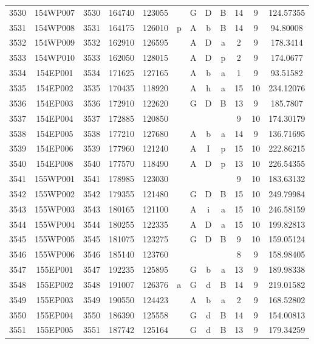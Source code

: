 \begin{tabular}{|*{12}{c|}}
3530 & 154WP007 & 3530 & 164740 & 123055 &  & G & D & B & 14 & 9 & 124.57355 \\ 
3531 & 154WP008 & 3531 & 164175 & 126010 & p & A & b & B & 14 & 9 & 94.80008 \\ 
3532 & 154WP009 & 3532 & 162910 & 126595 &  & A & D & a & 2 & 9 & 178.3414 \\ 
3533 & 154WP010 & 3533 & 162050 & 128015 &  & A & D & p & 2 & 9 & 174.0677 \\ 
3534 & 154EP001 & 3534 & 171625 & 127165 &  & A & b & a & 1 & 9 & 93.51582 \\ 
3535 & 154EP002 & 3535 & 170435 & 118920 &  & A & h & a & 15 & 10 & 234.12076 \\ 
3536 & 154EP003 & 3536 & 172910 & 122620 &  & G & D & B & 13 & 9 & 185.7807 \\ 
3537 & 154EP004 & 3537 & 172885 & 120850 &  &  &  &  & 9 & 10 & 174.30179 \\ 
3538 & 154EP005 & 3538 & 177210 & 127680 &  & A & b & a & 14 & 9 & 136.71695 \\ 
3539 & 154EP006 & 3539 & 177960 & 121240 &  & A & I & p & 15 & 10 & 222.86215 \\ 
3540 & 154EP008 & 3540 & 177570 & 118490 &  & A & D & p & 13 & 10 & 226.54355 \\ 
3541 & 155WP001 & 3541 & 178985 & 123030 &  &  &  &  & 9 & 10 & 183.63132 \\ 
3542 & 155WP002 & 3542 & 179355 & 121480 &  & G & D & B & 15 & 10 & 249.79984 \\ 
3543 & 155WP003 & 3543 & 180165 & 121100 &  & A & i & a & 15 & 10 & 246.58159 \\ 
3544 & 155WP004 & 3544 & 180255 & 122335 &  & A & D & a & 15 & 10 & 199.82813 \\ 
3545 & 155WP005 & 3545 & 181075 & 123275 &  & G & D & B & 9 & 10 & 159.05124 \\ 
3546 & 155WP006 & 3546 & 185140 & 123760 &  &  &  &  & 8 & 9 & 158.98405 \\ 
3547 & 155EP001 & 3547 & 192235 & 125895 &  & G & b & a & 13 & 9 & 189.98338 \\ 
3548 & 155EP002 & 3548 & 191007 & 126376 & a & G & d & B & 14 & 9 & 219.01582 \\ 
3549 & 155EP003 & 3549 & 190550 & 124423 &  & A & b & a & 2 & 9 & 168.52802 \\ 
3550 & 155EP004 & 3550 & 186390 & 125558 &  & G & d & B & 14 & 9 & 154.00813 \\ 
3551 & 155EP005 & 3551 & 187742 & 125164 &  & G & d & B & 13 & 9 & 179.34259 \\ 

\end{tabular}
